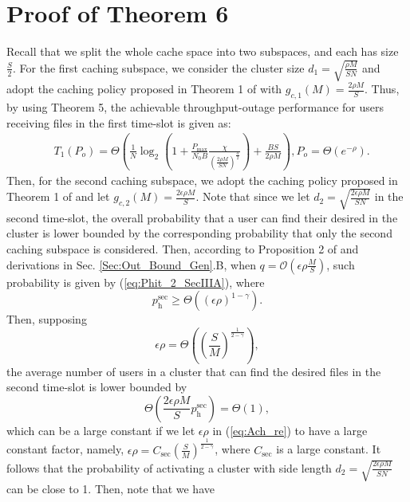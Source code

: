 \documentclass[journal,draftclsnofoot,onecolumn,12pt,twoside]{IEEEtran}
\begin{document}
\section{Proof of Theorem 6}

\label{App:ProofThm6}

Recall that we split the whole cache space into two subspaces, and each has size $\frac{S}{2}$. For the first caching subspace, we consider the cluster size $d_1=\sqrt{\frac{\rho M}{SN}}$ and adopt the caching policy proposed in Theorem 1 of \cite{lee2020optimal} with $g_{c,1}(M)=\frac{2\rho M}{S}$. Thus, by using Theorem 5, the achievable throughput-outage performance for users receiving files in the first time-slot is given as:
\begin{equation}
\begin{aligned}
&T_1(P_o)= \Theta\left(\frac{1}{N}\log_2\left(1+\frac{P_{\text{max}}}{N_0B}\frac{\chi}{\left(\frac{2\rho M}{SN}\right)^\frac{\alpha}{2}}\right)+\frac{BS}{2\rho M}\right),P_o= \Theta\left(e^{-\rho}\right).
\end{aligned}
\end{equation}
Then, for the second caching subspace, we adopt the caching policy proposed in Theorem 1 of \cite{lee2020optimal} and let $g_{c,2}(M)=\frac{2\epsilon\rho M}{S}$. Note that since we let $d_2=\sqrt{\frac{2\epsilon\rho M}{SN}}$ in the second time-slot, the overall probability that a user can find their desired in the cluster is lower bounded by the corresponding probability that only the second caching subspace is considered. Then, according to Proposition 2 of \cite{lee2020optimal} and derivations in Sec. \ref{Sec:Out_Bound_Gen}.B, when $q=\mathcal{O}\left(\epsilon\rho \frac{M}{S}\right)$, such probability is given by (\ref{eq:Phit_2_SecIIIA}), where
\begin{equation}
p_{\text{h}}^{\text{sec}}\geq\Theta((\epsilon\rho)^{1-\gamma}).
\end{equation}
Then, supposing
\begin{equation}\label{eq:Ach_re}
\epsilon\rho=\Theta\left(\left(\frac{S}{M}\right)^{\frac{1}{2-\gamma}}\right),
\end{equation}
the average number of users in a cluster that can find the desired files in the second time-slot is lower bounded by
\begin{equation}
\Theta\left(\frac{2\epsilon\rho M}{S}p_{\text{h}}^{\text{sec}}\right)=\Theta\left(1\right),
\end{equation}
which can be a large constant if we let $\epsilon\rho$ in (\ref{eq:Ach_re}) to have a large constant factor, namely, $\epsilon\rho=C_{\text{sec}}\left(\frac{S}{M}\right)^{\frac{1}{2-\gamma}}$, where $C_{\text{sec}}$ is a large constant. It follows that the probability of activating a cluster with side length $d_2=\sqrt{\frac{2\epsilon\rho M}{SN}}$ can be close to 1. Then, note that we have 
\end{document}
